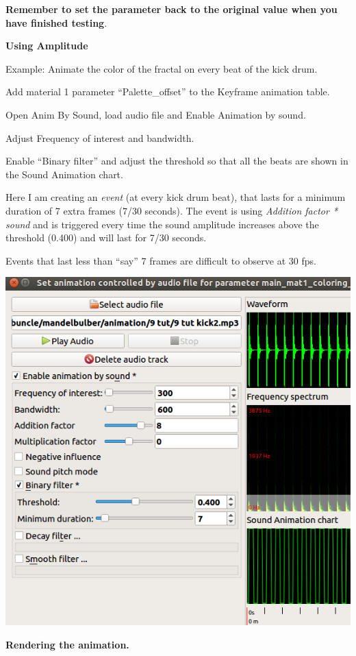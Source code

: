 \textbf{Remember to set the parameter back to the original value when
you have finished testing}.

\textbf{Using Amplitude}

Example: Animate the color of the fractal on every beat of the kick
drum.

Add material 1 parameter ``Palette\_offset'' to the Keyframe animation
table.

Open Anim By Sound, load audio file and Enable Animation by sound.

Adjust Frequency of interest and bandwidth.

Enable ``Binary filter'' and adjust the threshold so that all the beats
are shown in the Sound Animation chart.

Here I am creating an \emph{event} (at every kick drum beat), that lasts
for a minimum duration of 7 extra frames (7/30 seconds). The event is
using \emph{Addition factor * sound} and is triggered every time the
sound amplitude increases above the threshold (0.400) and will last for
7/30 seconds.

Events that last less than ``say'' 7 frames are difficult to observe at
30 fps.

\includegraphics[width=5.24528in,height=5.29016in]{img/sound/media/image8.png}

\textbf{Rendering the animation.}

